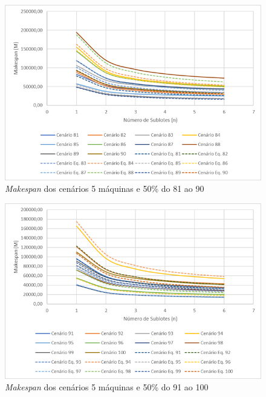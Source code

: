 \begin{figure}[H]
    \centering
    \includegraphics[width=13cm]{Apendices/Figuras/05m50_81-90.png}
    \caption{\textit{Makespan} dos cenários 5 máquinas e 50\% do 81 ao 90}
    \label{fig:05m50_81-90}
\end{figure}

\begin{figure}[H]
    \centering
    \includegraphics[width=13cm]{Apendices/Figuras/05m50_91-100.png}
    \caption{\textit{Makespan} dos cenários 5 máquinas e 50\% do 91 ao 100}
    \label{fig:05m50_91-100}
\end{figure}